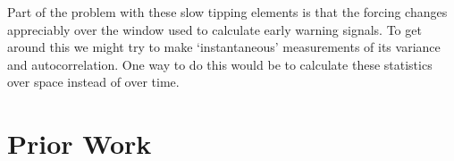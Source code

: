 Part of the problem with these slow tipping elements is that the forcing changes appreciably over the window used to calculate early warning signals.
To get around this we might try to make `instantaneous' measurements of its variance and autocorrelation. One way to do this would be to calculate these
statistics over space instead of over time.

\section{Prior Work}
